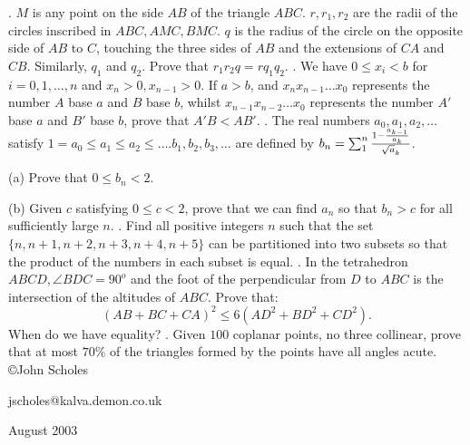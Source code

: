 \nopagenumbers
{}
\vskip 25pt
. $M$ is any point on the side $AB$ of the triangle $ABC$. $r,r_1,r_2$ are the radii of the circles inscribed in $ABC,AMC,BMC$. $q$ is the radius of the circle on the opposite side of $AB$ to $C$, touching the three sides of $AB$ and the extensions of $CA$ and $CB$. Similarly, $q_1$ and $q_2$. Prove that $r_1r_2q=rq_1q_2$.
\vskip 12pt
. We have $0\le x_i<b$ for $i=0,1,\ldots,n$ and $x_n>0,x_{n-1}>0$. If $a>b$, and $x_nx_{n-1}\ldots x_0$ represents the number $A$ base $a$ and $B$ base $b$, whilst $x_{n-1}x_{n-2}\ldots x_0$ represents the number $A'$ base $a$ and $B'$ base $b$, prove that $A'B<AB'$.
\vskip 12pt
. The real numbers $a_0,a_1,a_2,\ldots$ satisfy $1=a_0\le a_1\le a_2\le\ldots. b_1,b_2,b_3,\ldots$ are defined by $b_n=\sum_1^n{1-{a_{k-1}\over a_k}\over\sqrt a_k}$.

(a) Prove that $0\le b_n<2$.

(b) Given $c$ satisfying $0\le c<2$, prove that we can find $a_n$ so that $b_n>c$ for all sufficiently large $n$.
\vskip 12pt
. Find all positive integers $n$ such that the set $\{n,n+1,n+2,n+3,n+4,n+5\}$ can be partitioned into two subsets so that the product of the numbers in each subset is equal.
\vskip 12pt
. In the tetrahedron $ABCD,\angle BDC=90^o$ and the foot of the perpendicular from $D$ to $ABC$ is the intersection of the altitudes of $ABC$. Prove that: $$(AB+BC+CA)^2\le6(AD^2+BD^2+CD^2).$$ When do we have equality?
\vskip 12pt
. Given $100$ coplanar points, no three collinear, prove that at most $70\%$ of the triangles formed by the points have all angles acute.
\vskip 20pt
\noindent \copyright John Scholes

\noindent jscholes@kalva.demon.co.uk

 August 2003

\bye

